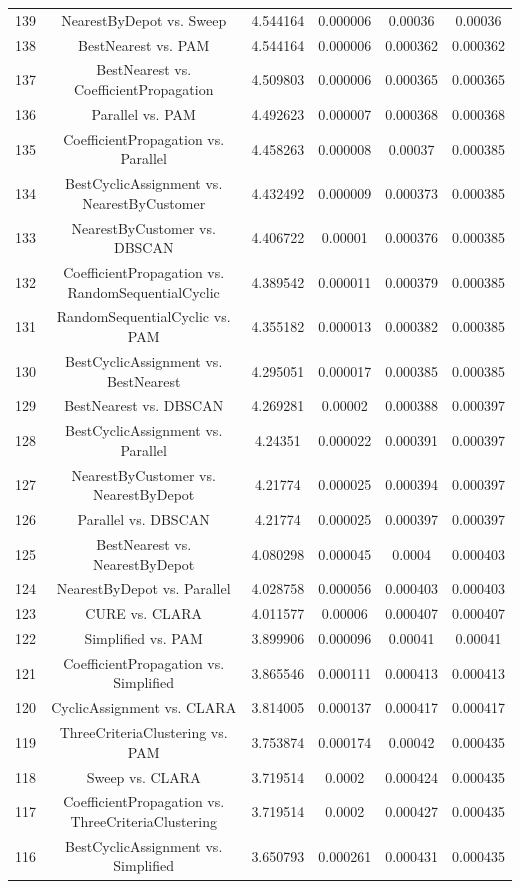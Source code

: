 \documentclass[a4paper,10pt]{article}
\begin{document}
\begin{landscape}
\begin{table}[!htp]
\begin{tabular}{cccccc}
139&NearestByDepot vs. Sweep&4.544164&0.000006&0.00036&0.00036\\
138&BestNearest vs. PAM&4.544164&0.000006&0.000362&0.000362\\
137&BestNearest vs. CoefficientPropagation&4.509803&0.000006&0.000365&0.000365\\
136&Parallel vs. PAM&4.492623&0.000007&0.000368&0.000368\\
135&CoefficientPropagation vs. Parallel&4.458263&0.000008&0.00037&0.000385\\
134&BestCyclicAssignment vs. NearestByCustomer&4.432492&0.000009&0.000373&0.000385\\
133&NearestByCustomer vs. DBSCAN&4.406722&0.00001&0.000376&0.000385\\
132&CoefficientPropagation vs. RandomSequentialCyclic&4.389542&0.000011&0.000379&0.000385\\
131&RandomSequentialCyclic vs. PAM&4.355182&0.000013&0.000382&0.000385\\
130&BestCyclicAssignment vs. BestNearest&4.295051&0.000017&0.000385&0.000385\\
129&BestNearest vs. DBSCAN&4.269281&0.00002&0.000388&0.000397\\
128&BestCyclicAssignment vs. Parallel&4.24351&0.000022&0.000391&0.000397\\
127&NearestByCustomer vs. NearestByDepot&4.21774&0.000025&0.000394&0.000397\\
126&Parallel vs. DBSCAN&4.21774&0.000025&0.000397&0.000397\\
125&BestNearest vs. NearestByDepot&4.080298&0.000045&0.0004&0.000403\\
124&NearestByDepot vs. Parallel&4.028758&0.000056&0.000403&0.000403\\
123&CURE vs. CLARA&4.011577&0.00006&0.000407&0.000407\\
122&Simplified vs. PAM&3.899906&0.000096&0.00041&0.00041\\
121&CoefficientPropagation vs. Simplified&3.865546&0.000111&0.000413&0.000413\\
120&CyclicAssignment vs. CLARA&3.814005&0.000137&0.000417&0.000417\\
119&ThreeCriteriaClustering vs. PAM&3.753874&0.000174&0.00042&0.000435\\
118&Sweep vs. CLARA&3.719514&0.0002&0.000424&0.000435\\
117&CoefficientPropagation vs. ThreeCriteriaClustering&3.719514&0.0002&0.000427&0.000435\\
116&BestCyclicAssignment vs. Simplified&3.650793&0.000261&0.000431&0.000435\\

\end{tabular}
\end{table}
\end{landscape}
\end{document}
